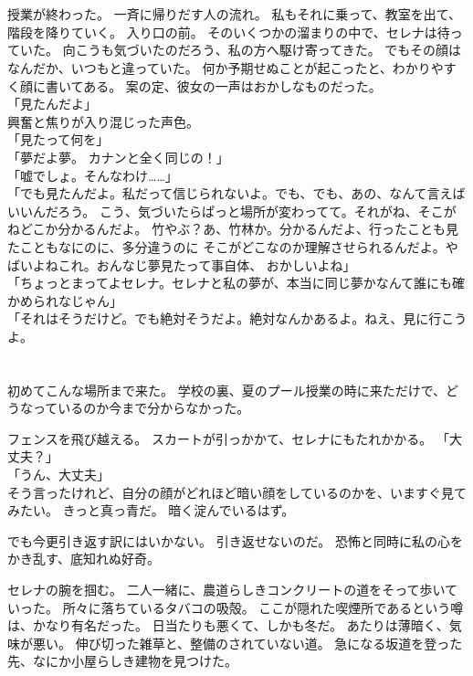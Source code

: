 \documentclass[../IHMain]{subfiles}
\begin{document}
\section{}
授業が終わった。
一斉に帰りだす人の流れ。
私もそれに乗って、教室を出て、階段を降りていく。
入り口の前。
そのいくつかの溜まりの中で、セレナは待っていた。
向こうも気づいたのだろう、私の方へ駆け寄ってきた。
でもその顔はなんだか、いつもと違っていた。
何か予期せぬことが起こったと、わかりやすく顔に書いてある。
案の定、彼女の一声はおかしなものだった。\\
「見たんだよ」\\
興奮と焦りが入り混じった声色。\\
「見たって何を」\\
「夢だよ夢。
カナンと全く同じの！」\\
「嘘でしょ。そんなわけ……」\\
「でも見たんだよ。私だって信じられないよ。でも、でも、あの、なんて言えばいいんだろう。
こう、気づいたらぱっと場所が変わってて。それがね、そこがねどこか分かるんだよ。
竹やぶ？あ、竹林か。分かるんだよ、行ったことも見たこともなにのに、多分違うのに
そこがどこなのか理解させられるんだよ。やばいよねこれ。おんなじ夢見たって事自体、
おかしいよね」\\
「ちょっとまってよセレナ。セレナと私の夢が、本当に同じ夢かなんて誰にも確かめられなじゃん」\\
「それはそうだけど。でも絶対そうだよ。絶対なんかあるよ。ねえ、見に行こうよ。
\section{}
初めてこんな場所まで来た。
学校の裏、夏のプール授業の時に来ただけで、どうなっているのか今まで分からなかった。

フェンスを飛び越える。
スカートが引っかかて、セレナにもたれかかる。
「大丈夫？」\\
「うん、大丈夫」\\
そう言ったけれど、自分の顔がどれほど暗い顔をしているのかを、いますぐ見てみたい。
きっと真っ青だ。
暗く淀んでいるはず。

でも今更引き返す訳にはいかない。
引き返せないのだ。
恐怖と同時に私の心をかき乱す、底知れぬ好奇。

セレナの腕を掴む。
二人一緒に、農道らしきコンクリートの道をそって歩いていった。
所々に落ちているタバコの吸殻。
ここが隠れた喫煙所であるという噂は、かなり有名だった。
日当たりも悪くて、しかも冬だ。
あたりは薄暗く、気味が悪い。
伸び切った雑草と、整備のされていない道。
急になる坂道を登った先、なにか小屋らしき建物を見つけた。
\end{document}
